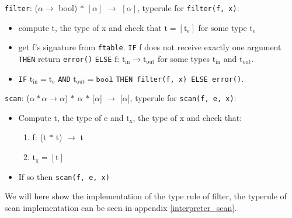 \documentclass[11pt]{article}
\begin{document}
    \texttt{filter}: ($\alpha \rightarrow$ bool) $\ast$ $[\alpha]$ $\rightarrow$
    $[\alpha]$, typerule for \texttt{filter(f, x)}:
    \vspace{-2.5mm}
    \begin{itemize}[noitemsep]
        \item compute t, the type of x and check that $\text{t} =
            [\text{t}_\text{e}]$ for some type $\text{t}_\text{e}$
        \item get f's signature from \texttt{ftable}. \texttt{IF} f does not
            receive exactly one argument \texttt{THEN} return \texttt{error()}
            \texttt{ELSE} $\text{f: t}_{\text{in}} \rightarrow
            \text{t}_{\text{out}}$ for some types $\text{t}_{\text{in}}$ and
            $\text{t}_{\text{out}}$.
        \item \texttt{IF} $\text{t}_{\text{in}} = \text{t}_\text{e}$
            \texttt{AND} $\text{t}_{\text{out}} = \texttt{bool}$ \texttt{THEN
            filter(f, x) ELSE error()}.
    \end{itemize}

    \texttt{scan}: ($\alpha \ast \alpha \rightarrow \alpha$) $\ast$ $\alpha$
    $\ast$ [$\alpha$] $\rightarrow$ [$\alpha$], typerule for
    \texttt{scan(f, e, x)}:
    \vspace{-2.5mm}
    \begin{itemize}[noitemsep]
        \item Compute t, the type of e and $\text{t}_\text{x}$, the type of x
            and check that:
        	\begin{enumerate}[noitemsep]
        	   \item f: (t $\ast$ t) $\rightarrow$ t
        	   \item $\text{t}_\text{x} = [\text{t}]$
    		\end{enumerate}
        \item If so then \texttt{scan(f, e, x)}
    \end{itemize}

    We will here show the implementation of the type rule of filter, the
    typerule of scan implementation can be seen in appendix
    \ref{interpreter_scan}.
\end{document}
